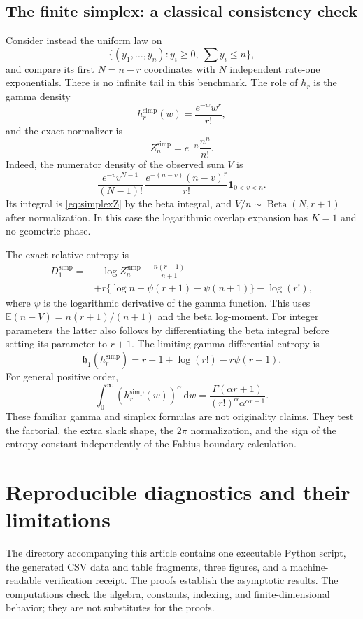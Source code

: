 \documentclass[11pt,oneside]{article}
\numberwithin{equation}{section}
\theoremstyle{plain}
\theoremstyle{definition}
\theoremstyle{remark}
\newcommand{\E}{\mathbb E}
\newcommand{\ind}{\mathbf 1}
\newcommand{\dd}{\,\mathrm d}
\begin{document}
\subsection{The finite simplex: a classical consistency check}
Consider instead the uniform law on
\[
 \{(y_1,\ldots,y_n): y_i\ge0,\ \sum y_i\le n\},
\]
and compare its first $N=n-r$ coordinates with $N$ independent
rate-one exponentials. There is no infinite tail in this benchmark.
The role of $h_r$ is the gamma density
\[
 h_r^{\mathrm{simp}}(w)=\frac{e^{-w}w^r}{r!},
\]
and the exact normalizer is
\begin{equation}\label{eq:simplexZ}
 Z_n^{\mathrm{simp}}=e^{-n}\frac{n^n}{n!}.
\end{equation}
Indeed, the numerator density of the observed sum $V$ is
\[
 \frac{e^{-v}v^{N-1}}{(N-1)!}\,
 \frac{e^{-(n-v)}(n-v)^r}{r!}\ind_{0<v<n}.
\]
Its integral is \eqref{eq:simplexZ} by the beta integral, and
$V/n\sim\operatorname{Beta}(N,r+1)$ after normalization. In this
case the logarithmic overlap expansion has $K=1$ and no geometric
phase.

The exact relative entropy is
\begin{align}
 D_1^{\mathrm{simp}}
 ={}&-\log Z_n^{\mathrm{simp}}
      -\frac{n(r+1)}{n+1} \nonumber\\
 &+r\{\log n+\psi(r+1)-\psi(n+1)\}-\log(r!),
 \label{eq:simplexKL}
\end{align}
where $\psi$ is the logarithmic derivative of the gamma function.
This uses $\E(n-V)=n(r+1)/(n+1)$ and the beta log-moment.
For integer parameters the latter also follows by differentiating
the beta integral before setting its parameter to $r+1$.
The limiting gamma differential entropy is
\[
 \mathfrak h_1(h_r^{\mathrm{simp}})
   =r+1+\log(r!)-r\psi(r+1).
\]
For general positive order,
\begin{equation}\label{eq:gammaRenyi}
 \int_0^\infty(h_r^{\mathrm{simp}}(w))^\alpha\dd w
 =\frac{\Gamma(\alpha r+1)}{(r!)^\alpha\alpha^{\alpha r+1}}.
\end{equation}
These familiar gamma and simplex formulas are not originality
claims. They test the factorial, the extra slack shape, the $2\pi$
normalization, and the sign of the entropy constant independently
of the Fabius boundary calculation.

\section{Reproducible diagnostics and their limitations}
\label{sec:numerics}
The directory accompanying this article contains one executable Python
script, the generated CSV data and table fragments, three figures, and a
machine-readable verification receipt. The proofs establish the
asymptotic results. The computations check the algebra, constants,
indexing, and finite-dimensional behavior; they are not substitutes for
the proofs.
\end{document}
